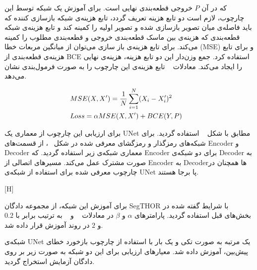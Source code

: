 که در آن $P$ خروجی قطعه‌بندی نهایی است. برای آموزش یک شبکه توسط این چارچوب، لازم است دو تابع هزینه تعریف گردد، تابع هزینه‌ی شبکه بازسازی کننده که باید فاصله‌ی میان تصویر بازسازی شده و تصویر اولیه را کمینه کند و تابع هزینه‌ی شبکه قطعه‌بندی که هزینه‌ی بین ماسک قطعه‌بندی خروجی و قطعه‌بندی مطلوب را کمینه می‌کند. برای تابع هزینه‌ی باز سازی می‌توان از میانگین مربعات خطا (MSE) و برای تابع هزینه‌ی قطعه‌بندی از BCE استفاده کرد. جمع وزن‌دار این دو تابع هزینه، هزینه‌ی نهایی را ایجاد می‌کند. معادلات  ~ تابع هزینه‌ی این چارچوب را به صورت فرمول‌بندی نشان می‌دهد.

\begin{alignat}{5}
	&MSE(X, X') = \frac{1}{N} \sum_{i=1}^{N}(X_i-X_i')^2    \notag  && \\
	&Loss = \alpha MSE(X, X') + BCE(Y, P) && \label{pepfinalloss}
\end{alignat}

برای ارزیابی این چارچوب از معماری یک UNet مطابق با شکل ~ استفاده گردید. برای شبکه‌های رمزگذار و رمزگشای معرفی شده در شکل ~، از قسمت‌های Encoder و  Decoder معماری شبکه‌ی زیر استفاده گردید. که Encoder برای دو شبکه‌ی Decoder به صورت مشترک عمل می‌کند. مسیرهای اتصالی از Encoder به Decoder‌ها همچنان در چارچوب معرفی شده برای استفاده از شبکه‌ی UNet  پا برجا هستند.

[H]

برای آموزش این شبکه، از مجموعه دادگان SegTHOR با شرایط گفته شده در بخش‌های قبل استفاده گردید. پارامترهای $\alpha$ و $\beta$ در معادلات ~ و ~ به ترتیب برابر با $0.2$ و $2$ در روند آموزش قرار داده شد.


شبکه‌ی UNet یک‌ مرتبه به صورت تکی و یک بار با استفاده از چارچوب بازخورد خطای پیش‌بین، آموزش داده شد. معیارهای ارزیابی برای این دو شبکه به صورت زیر بر روی دادگان آزمایش استخراج گردید.


